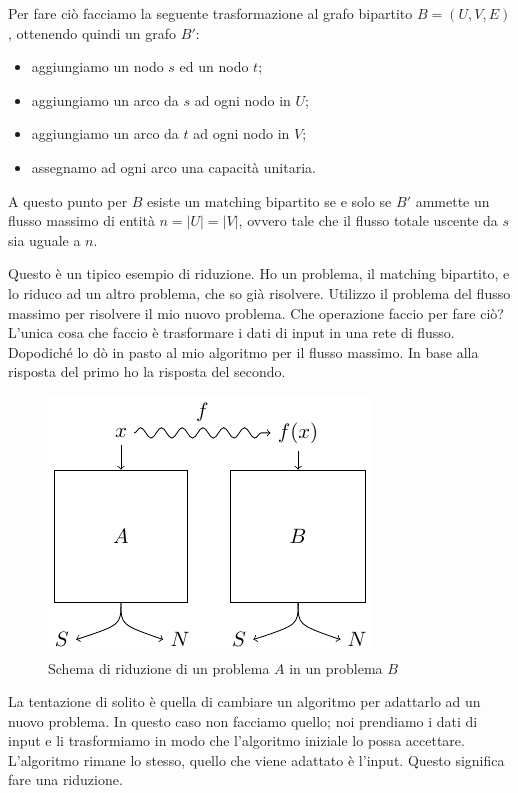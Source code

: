 Per fare ciò facciamo la seguente trasformazione al grafo bipartito $B = (U,V,E)$, ottenendo quindi un grafo
$B'$:
\begin{itemize}
    \item aggiungiamo un nodo $s$ ed un nodo $t$;
    \item aggiungiamo un arco da $s$ ad ogni nodo in $U$;
    \item aggiungiamo un arco da $t$ ad ogni nodo in $V$;
    \item assegnamo ad ogni arco una capacità unitaria.
\end{itemize}

A questo punto per $B$ esiste un matching bipartito se e solo se $B'$ ammette un flusso massimo di
entità $n = |U| = |V|$, ovvero tale che il flusso totale uscente da $s$ sia uguale a $n$.

Questo è un tipico esempio di riduzione. Ho un problema, il matching bipartito, e lo riduco ad un
altro problema, che so già risolvere. Utilizzo il problema del flusso massimo per risolvere il mio
nuovo problema. Che operazione faccio per fare ciò? L'unica cosa che faccio è trasformare i dati
di input in una rete di flusso. Dopodiché lo dò in pasto al mio algoritmo per il flusso massimo.
In base alla risposta del primo ho la risposta del secondo.

\begin{figure}[h]
    \begin{center}
        \includegraphics{img/Reducibility.pdf}
    \end{center}
    \caption{Schema di riduzione di un problema $A$ in un problema $B$}
\end{figure}

La tentazione di solito è quella di cambiare un algoritmo per adattarlo ad un nuovo problema. In
questo caso non facciamo quello; noi prendiamo i dati di input e li trasformiamo in modo che
l'algoritmo iniziale lo possa accettare. L'algoritmo rimane lo stesso, quello che viene adattato è
l'input. Questo significa fare una riduzione.

